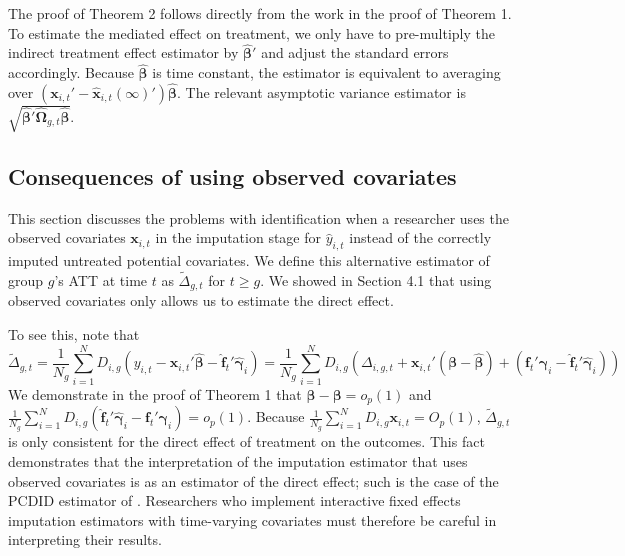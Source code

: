 \documentclass[12pt,fleqn]{article}
\def\*#1{\mathbf{#1}}
\def\+#1{\boldsymbol{#1}}
\begin{document}
\bigskip

The proof of Theorem 2 follows directly from the work in the proof of Theorem 1. To estimate the mediated effect on treatment, we only have to pre-multiply the indirect treatment effect estimator by $\widehat{\+\beta}'$ and adjust the standard errors accordingly. Because $\widehat{\+\beta}$ is time constant, the estimator is equivalent to averaging over $\left( \*x_{i,t}' - \widehat{\*x}_{i,t}(\infty)' \right) \widehat{\+\beta}$. The relevant asymptotic variance estimator is $\sqrt{\widehat{\+\beta}' \widehat{\+\Omega}_{g,t} \widehat{\+\beta}}$.



\subsection{Consequences of using observed covariates}\label{sec:post_treatment_bias}

This section discusses the problems with identification when a researcher uses the observed covariates $\*x_{i,t}$ in the imputation stage for $\widehat{y}_{i,t}$ instead of the correctly imputed untreated potential covariates. We define this alternative estimator of group $g$'s ATT at time $t$ as $\tilde{\Delta}_{g,t}$ for $t \geq g$. We showed in Section 4.1 that using observed covariates only allows us to estimate the direct effect. 

To see this, note that
\begin{equation}
    \tilde{\Delta}_{g,t} = \frac{1}{N_g} \sum_{i = 1}^N D_{i,g} \left( y_{i,t} - \*x_{i,t}' \widehat{\+\beta} - \widehat{\*f}_t' \widehat{\+\gamma}_i \right) = \frac{1}{N_g} \sum_{i = 1}^N D_{i,g} \left( \Delta_{i,g,t} + \*x_{i,t}' (\+\beta - \widehat{\+\beta}) + \left( \*f_t' \+\gamma_i - \widehat{\*f}_t' \widehat{\+\gamma}_i \right) \right)
\end{equation}
We demonstrate in the proof of Theorem 1 that $\widehat{\+\beta} - \+\beta = o_p(1)$ and $\frac{1}{N_g} \sum_{i = 1}^N D_{i,g} \left( \widehat{\*f}_t' \widehat{\+\gamma}_i - \*f_t' \+\gamma_i \right) = o_p(1)$. Because $\frac{1}{N_g} \sum_{i = 1}^N D_{i,g} \*x_{i,t} = O_p(1)$, $\tilde{\Delta}_{g,t}$ is only consistent for the direct effect of treatment on the outcomes. This fact demonstrates that the interpretation of the imputation estimator that uses observed covariates is as an estimator of the direct effect; such is the case of the PCDID estimator of \citet{chan2022pcdid}. Researchers who implement interactive fixed effects imputation estimators with time-varying covariates must therefore be careful in interpreting their results.
\end{document}
